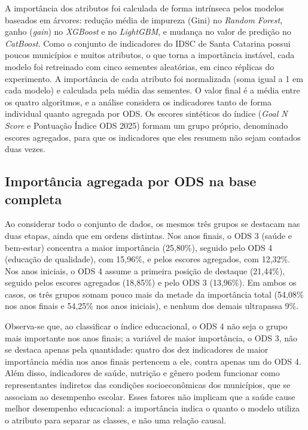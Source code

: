 A importância dos atributos foi calculada de forma intrínseca pelos modelos baseados em árvores: redução média de impureza (Gini) no \textit{Random Forest}, ganho (\textit{gain}) no \textit{XGBoost} e no \textit{LightGBM}, e mudança no valor de predição no \textit{CatBoost}. Como o conjunto de indicadores do IDSC de Santa Catarina possui poucos municípios e muitos atributos, o que torna a importância instável, cada modelo foi retreinado com cinco sementes aleatórias, em cinco réplicas do experimento. A importância de cada atributo foi normalizada (soma igual a 1 em cada modelo) e calculada pela média das sementes. O valor final é a média entre os quatro algoritmos, e a análise considera os indicadores tanto de forma individual quanto agregada por ODS. Os escores sintéticos do índice (\textit{Goal N Score} e Pontuação Índice ODS 2025) formam um grupo próprio, denominado escores agregados, para que os indicadores que eles resumem não sejam contados duas vezes.

\subsection{Importância agregada por ODS na base completa}

Ao considerar todo o conjunto de dados, os mesmos três grupos se destacam nas duas etapas, ainda que em ordens distintas. Nos anos finais, o ODS 3 (saúde e bem-estar) concentra a maior importância (25,80\%), seguido pelo ODS 4 (educação de qualidade), com 15,96\%, e pelos escores agregados, com 12,32\%. Nos anos iniciais, o ODS 4 assume a primeira posição de destaque (21,44\%), seguido pelos escores agregados (18,85\%) e pelo ODS 3 (13,96\%). Em ambos os casos, os três grupos somam pouco mais da metade da importância total (54,08\% nos anos finais e 54,25\% nos anos iniciais), e nenhum dos demais ultrapassa 9\%.

Observa-se que, ao classificar o índice educacional, o ODS 4 não seja o grupo mais importante nos anos finais; a variável de maior importância, o ODS 3, não se destaca apenas pela quantidade: quatro dos dez indicadores de maior importância média nos anos finais pertencem a ele, contra apenas um do ODS 4. Além disso, indicadores de saúde, nutrição e gênero podem funcionar como representantes indiretos das condições socioeconômicas dos municípios, que se associam ao desempenho escolar. Esses fatores não implicam que a saúde cause melhor desempenho educacional: a importância indica o quanto o modelo utiliza o atributo para separar as classes, e não uma relação causal.

